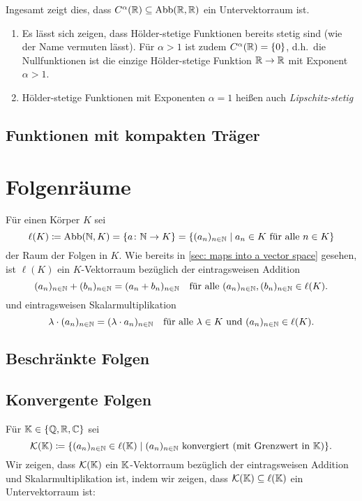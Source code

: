 Ingesamt zeigt dies, dass $C^\alpha(\mathbb{R}) \subseteq \mathrm{Abb}(\mathbb{R}, \mathbb{R})$ ein Untervektorraum ist.

\begin{bem}
 \begin{enumerate}[leftmargin=*]
  \item
   Es lässt sich zeigen, dass Hölder-stetige Funktionen bereits stetig sind (wie der Name vermuten lässt). Für $\alpha > 1$ ist zudem $C^\alpha(\mathbb{R}) = \{0\}$, d.h.\ die Nullfunktionen ist die einzige Hölder-stetige Funktion $\mathbb{R} \to \mathbb{R}$ mit Exponent $\alpha > 1$.
  \item
   Hölder-stetige Funktionen mit Exponenten $\alpha = 1$ heißen auch \emph{Lipschitz-stetig}
 \end{enumerate}
\end{bem}


\subsection{Funktionen mit kompakten Träger}







\section{Folgenräume}
Für einen Körper $K$ sei
\[
 \ell(K)
 \coloneqq \mathrm{Abb}(\mathbb{N}, K)
 = \{a \colon \mathbb{N} \to K\}
 = \{(a_n)_{n \in \mathbb{N}} \mid \text{$a_n \in K$ für alle $n \in K$}\}
\]
der Raum der Folgen in $K$. Wie bereits in \ref{sec: maps into a vector space} gesehen, ist $\ell(K)$ ein $K$-Vektorraum bezüglich der eintragsweisen Addition
\[
 (a_n)_{n \in \mathbb{N}} + (b_n)_{n \in \mathbb{N}} = (a_n + b_n)_{n \in \mathbb{N}}
 \quad
 \text{für alle $(a_n)_{n \in \mathbb{N}}, (b_n)_{n \in \mathbb{N}} \in \ell(K)$}.
\]
und eintragsweisen Skalarmultiplikation
\[
 \lambda \cdot (a_n)_{n \in \mathbb{N}}
 = (\lambda \cdot a_n)_{n \in \mathbb{N}}
 \quad
 \text{für alle $\lambda \in K$ und $(a_n)_{n \in \mathbb{N}} \in \ell(K)$}.
\]


\subsection{Beschränkte Folgen}


\subsection{Konvergente Folgen}
Für $\mathbb{K} \in \{\mathbb{Q}, \mathbb{R}, \mathbb{C}\}$  sei
\[
 \mathcal{K}(\mathbb{K})
 \coloneqq
 \{(a_n)_{n \in \mathbb{N}} \in \ell(\mathbb{K}) \mid \text{$(a_n)_{n \in \mathbb{N}}$ konvergiert (mit Grenzwert in $\mathbb{K}$)}\}.
\]
Wir zeigen, dass $\mathcal{K}(\mathbb{K})$ ein $\mathbb{K}$-Vektorraum bezüglich der eintragsweisen Addition und Skalarmultiplikation ist, indem wir zeigen, dass $\mathcal{K}(\mathbb{K}) \subseteq \ell(\mathbb{K})$ ein Untervektorraum ist:

